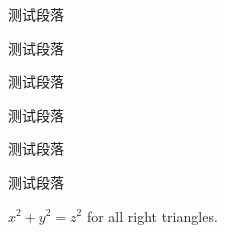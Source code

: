 \documentclass[11pt,a4paper]{article}
\theoremstyle{mystyle}
\begin{document}
\setlength{\parskip}{0em}



测试段落

测试段落

测试段落


\setlength{\parskip}{0.5\baselineskip}



测试段落

测试段落

测试段落

$x^2+y^2=z^2$ for all right triangles.

	
\end{document}
